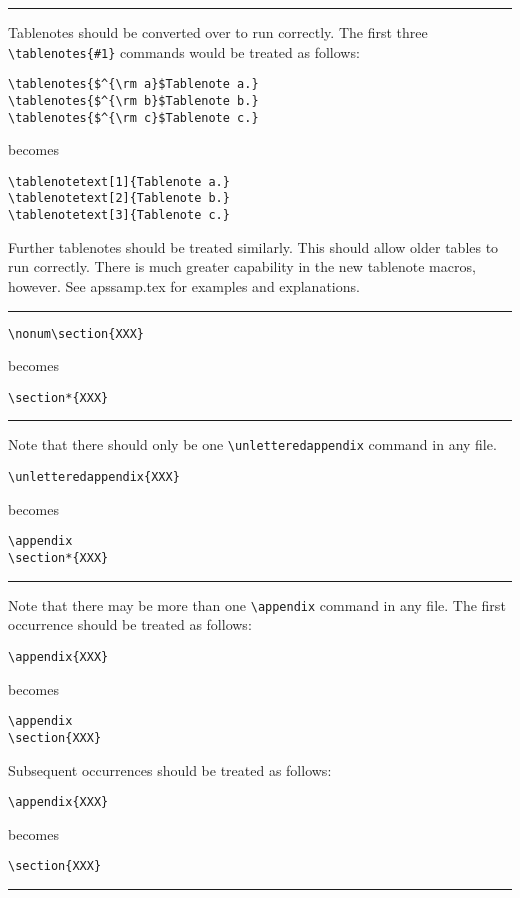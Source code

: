   \smallskip \hrule  \smallskip
Tablenotes should be converted over to run correctly. The first three
\verb+\tablenotes{#1}+ commands would be treated as follows:
\begin{verbatim}
\tablenotes{$^{\rm a}$Tablenote a.}
\tablenotes{$^{\rm b}$Tablenote b.}
\tablenotes{$^{\rm c}$Tablenote c.}
\end{verbatim}
becomes
\begin{verbatim}
\tablenotetext[1]{Tablenote a.}
\tablenotetext[2]{Tablenote b.}
\tablenotetext[3]{Tablenote c.}
\end{verbatim}
Further tablenotes should be treated similarly.
This should allow older tables to run correctly. There is much greater
capability in the new tablenote macros, however. See apssamp.tex for
examples and explanations.
  \smallskip \hrule  \smallskip
\begin{verbatim}
\nonum\section{XXX}
\end{verbatim}
  becomes
\begin{verbatim}
\section*{XXX}
\end{verbatim}
  \smallskip \hrule  \smallskip
Note that there should only be one \verb+\unletteredappendix+
command in any file.
\begin{verbatim}
\unletteredappendix{XXX}
\end{verbatim}
  becomes
\begin{verbatim}
\appendix
\section*{XXX}
\end{verbatim}
  \smallskip \hrule  \smallskip
Note that there may be more than one \verb+\appendix+
command in any file. The first occurrence should be treated as follows:
\begin{verbatim}
\appendix{XXX}
\end{verbatim}
  becomes
\begin{verbatim}
\appendix
\section{XXX}
\end{verbatim}
Subsequent occurrences should be treated as follows:
\begin{verbatim}
\appendix{XXX}
\end{verbatim}
  becomes
\begin{verbatim}
\section{XXX}
\end{verbatim}
\nobreak  \smallskip \hrule \nobreak \smallskip





